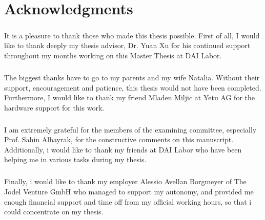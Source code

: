 \chapter*{Acknowledgments} 
\paragraph*{} It is a pleasure to thank those who made this thesis possible. First of all, I would like to thank deeply my thesis advisor, Dr. Yuan Xu for his continued support throughout my months working on this Master Thesis at DAI Labor.

\paragraph*{} The biggest thanks have to go to my parents and my wife Natalia. Without their support, encouragement and patience, this thesis would not have been completed. Furthermore, I would like to thank my friend Mladen Miljic at Yetu AG for the hardware support for this work.

\paragraph*{} I am extremely grateful for the members of the examining committee, especially Prof. Sahin Albayrak, for the constructive comments on this manuscript. Additionally, i would like to thank my friends at DAI Labor who have been helping me in various tasks during my thesis.

\paragraph*{} Finally, i would like to thank my employer Alessio Avellan Borgmeyer of The Jodel Venture GmbH who managed to support my autonomy, and provided me enough financial support and time off from my official working hours, so that i could concentrate on my thesis.
